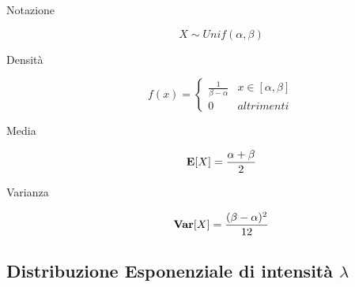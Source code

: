 \begin{description}
	
	\item [Notazione]
		\begin{equation}
		X \sim Unif(\alpha,\beta)
		\end{equation}
	
	\item [Densità]
		\begin{equation}
		f(x) = \left\{\begin{matrix}
		\frac{1}{\beta - \alpha} & x\in [ \alpha,\beta ] \\
		0 & altrimenti
		\end{matrix}\right.
		\end{equation}
	
	\item [Media]
		\begin{equation}
		\mathbf{E}[X] = \frac{\alpha+\beta}{2}
		\end{equation}
	
	\item [Varianza]
		\begin{equation}
		\mathbf{Var}[X] = \frac{(\beta-\alpha)^{2}}{12}
		\end{equation}
	
\end{description}


\subsection{Distribuzione Esponenziale di intensità $\lambda$}

